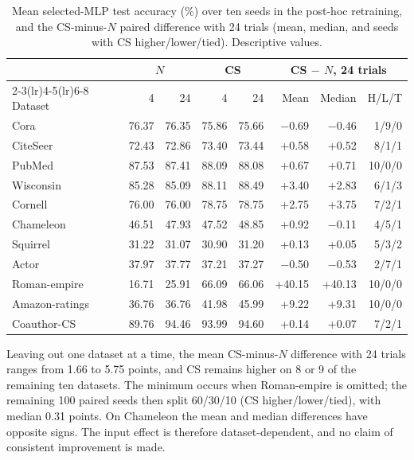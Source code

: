 \begin{table}[tbp]
\centering
\caption{Mean selected-MLP test accuracy (\%) over ten seeds in the post-hoc retraining, and the CS-minus-$N$ paired difference with 24 trials (mean, median, and seeds with CS higher/lower/tied). Descriptive values.}
\label{tab:mlp_budget_datasets}
\scriptsize
\setlength{\tabcolsep}{3.2pt}
\begin{tabular}{@{}lrrrrrrr@{}}
\toprule
 & \multicolumn{2}{c}{$N$} & \multicolumn{2}{c}{CS} & \multicolumn{3}{c}{CS $-$ $N$, 24 trials} \\
\cmidrule(lr){2-3}\cmidrule(lr){4-5}\cmidrule(lr){6-8}
Dataset & 4 & 24 & 4 & 24 & Mean & Median & H/L/T \\
\midrule
Cora & 76.37 & 76.35 & 75.86 & 75.66 & $-$0.69 & $-$0.46 & 1/9/0 \\
CiteSeer & 72.43 & 72.86 & 73.40 & 73.44 & +0.58 & +0.52 & 8/1/1 \\
PubMed & 87.53 & 87.41 & 88.09 & 88.08 & +0.67 & +0.71 & 10/0/0 \\
Wisconsin & 85.28 & 85.09 & 88.11 & 88.49 & +3.40 & +2.83 & 6/1/3 \\
Cornell & 76.00 & 76.00 & 78.75 & 78.75 & +2.75 & +3.75 & 7/2/1 \\
Chameleon & 46.51 & 47.93 & 47.52 & 48.85 & +0.92 & $-$0.11 & 4/5/1 \\
Squirrel & 31.22 & 31.07 & 30.90 & 31.20 & +0.13 & +0.05 & 5/3/2 \\
Actor & 37.97 & 37.77 & 37.21 & 37.27 & $-$0.50 & $-$0.53 & 2/7/1 \\
Roman-empire & 16.71 & 25.91 & 66.09 & 66.06 & +40.15 & +40.13 & 10/0/0 \\
Amazon-ratings & 36.76 & 36.76 & 41.98 & 45.99 & +9.22 & +9.31 & 10/0/0 \\
Coauthor-CS & 89.76 & 94.46 & 93.99 & 94.60 & +0.14 & +0.07 & 7/2/1 \\
\bottomrule
\end{tabular}
\end{table}

Leaving out one dataset at a time, the mean CS-minus-$N$ difference with 24 trials ranges from 1.66 to 5.75 points, and CS remains higher on 8 or 9 of the remaining ten datasets. The minimum occurs when Roman-empire is omitted; the remaining 100 paired seeds then split 60/30/10 (CS higher/lower/tied), with median 0.31 points. On Chameleon the mean and median differences have opposite signs. The input effect is therefore dataset-dependent, and no claim of consistent improvement is made.

